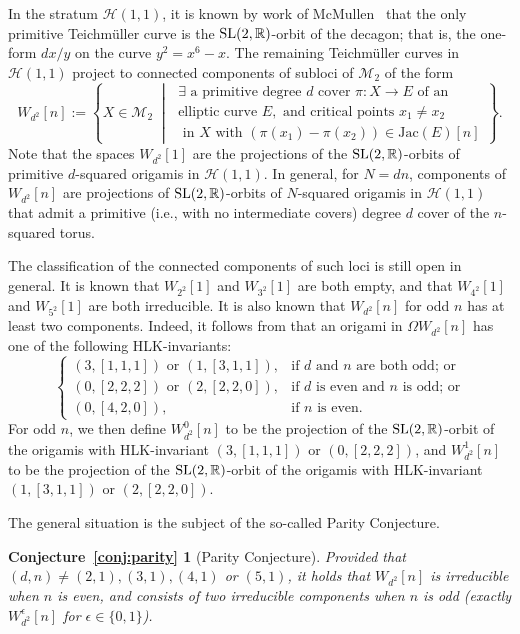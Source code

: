 \documentclass[a4paper,11pt]{amsart}
\numberwithin{equation}{section}
\numberwithin{figure}{section}
\numberwithin{table}{section}
\newtheorem*{conjPar}{Conjecture~\ref*{conj:parity}}
\newcommand{\teichmuller}{Teichm{\"u}ller }
\newcommand{\calH}{\mathcal{H}}
\newcommand{\R}{\mathbb{R}}
\DeclareMathOperator{\SL}{{\rm{SL}}}
\begin{document}
In the stratum $\calH(1,1)$, it is known by work of McMullen~\cite{McM-dec} that the only primitive \teichmuller curve is the $\SL(2,\R)$-orbit of the decagon; that is, the one-form $dx/y$ on the curve $y^2 = x^6 - x$. The remaining \teichmuller curves in $\calH(1,1)$ project to connected components of subloci of $\mathcal{M}_{2}$ of the form
\[W_{d^2}[n] := \left\{X\in\mathcal{M}_{2}\;\middle|\;\!\begin{array}{c}\exists\text{ a primitive degree }d\text{ cover }\pi:X\to E
\text{ of an}\\ \text{elliptic curve }E,\text{ and critical points }x_1\neq x_2\\\text{ in }X\text{ with }(\pi(x_1)-\pi(x_2))\in\text{Jac}(E)[n] \end{array}\!\right\}.\]
Note that the spaces $W_{d^2}[1]$ are the projections of the $\SL(2,\R)$-orbits of primitive $d$-squared origamis in $\calH(1,1)$. In general, for $N = dn$, components of $W_{d^2}[n]$ are projections of $\SL(2,\R)$-orbits of $N$-squared origamis in $\calH(1,1)$ that admit a primitive (i.e., with no intermediate covers) degree $d$ cover of the $n$-squared torus.

The classification of the connected components of such loci is still open in general. It is known that $W_{2^2}[1]$ and $W_{3^2}[1]$ are both empty, and that $W_{4^2}[1]$ and $W_{5^2}[1]$ are both irreducible. It is also known that $W_{d^2}[n]$ for odd $n$ has at least two components. Indeed, it follows from \cite[Theorem 3.1]{Dur} that an origami in $\Omega W_{d^2}[n]$ has one of the following HLK-invariants:
\[\left\lbrace\begin{array}{cl}
   (3,[1,1,1])\text{ or }(1,[3,1,1]),  & \text{if $d$ and $n$ are both odd; or} \\
   (0,[2,2,2])\text{ or }(2,[2,2,0]), & \text{if $d$ is even and $n$ is odd; or} \\
   (0,[4,2,0]), & \text{if $n$ is even.}
\end{array}\right.\]
For odd $n$, we then define $W_{d^2}^{0}[n]$ to be the projection of the $\SL(2,\R)$-orbit of the origamis with HLK-invariant $(3,[1,1,1])$ or $(0,[2,2,2])$, and $W_{d^2}^{1}[n]$ to be the projection of the $\SL(2,\R)$-orbit of the origamis with HLK-invariant $(1,[3,1,1])$ or $(2,[2,2,0])$.

The general situation is the subject of the so-called Parity Conjecture.

\begin{conjPar}[Parity Conjecture]
    Provided that $(d,n) \neq (2,1),(3,1),(4,1)$ or $(5,1)$, it holds that $W_{d^2}[n]$ is irreducible when $n$ is even, and consists of two irreducible components when $n$ is odd (exactly $W_{d^2}^{\epsilon}[n]$ for $\epsilon\in\{0,1\}$).
\end{conjPar}
\end{document}
